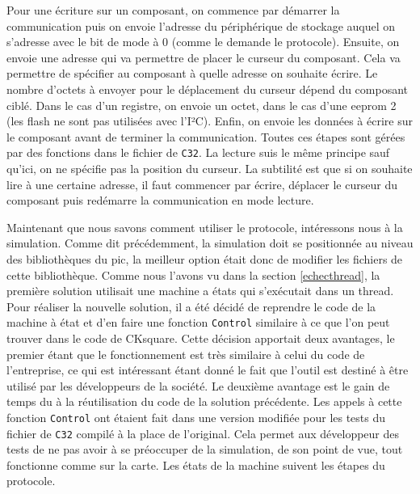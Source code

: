 \documentclass[a4paper]{article}
\begin{document}
Pour une écriture sur un composant, on commence par démarrer la communication
puis on envoie l'adresse du périphérique de stockage auquel on s'adresse avec le
bit de mode à 0 (comme le demande le protocole). Ensuite, on envoie une adresse
qui va permettre de placer le curseur du composant. Cela va permettre de
spécifier au composant à quelle adresse on souhaite écrire. Le nombre d'octets à
envoyer pour le déplacement du curseur dépend du composant ciblé. Dans le cas
d'un registre, on envoie un octet, dans le cas d'une eeprom 2 (les flash ne sont
pas utilisées avec l'I²C). Enfin, on envoie les données à écrire sur le
composant avant de terminer la communication. Toutes ces étapes sont gérées par
des fonctions dans le fichier de \verb|C32|. La lecture suis le même principe
sauf qu'ici, on ne spécifie pas la position du curseur. La subtilité est que si
on souhaite lire à une certaine adresse, il faut commencer par écrire, déplacer
le curseur du composant puis redémarre la communication en mode lecture.

Maintenant que nous savons comment utiliser le protocole, intéressons nous à la
simulation. Comme dit précédemment, la simulation doit se positionnée au niveau
des bibliothèques du \gls{pic}, la meilleur option était donc de modifier les
fichiers de cette bibliothèque. Comme nous l'avons vu dans la section
\ref{echecthread}, la première solution utilisait une machine a états qui
s'exécutait dans un thread. Pour réaliser la nouvelle solution, il a été décidé
de reprendre le code de la machine à état et d'en faire une fonction
\verb|Control| similaire à ce que l'on peut trouver dans le code de
CKsquare. Cette décision apportait deux avantages, le premier étant que le
fonctionnement est très similaire à celui du code de l'entreprise, ce qui est
intéressant étant donné le fait que l'outil est destiné à être utilisé par les
développeurs de la société. Le deuxième avantage est le gain de temps du à la
réutilisation du code de la solution précédente. Les appels à cette fonction
\verb|Control| ont étaient fait dans une version modifiée pour les tests du
fichier de \verb|C32| compilé à la place de l'original. Cela permet aux
développeur des tests de ne pas avoir à se préoccuper de la simulation, de son
point de vue, tout fonctionne comme sur la carte. Les états de la machine
suivent les étapes du protocole.
\end{document}
